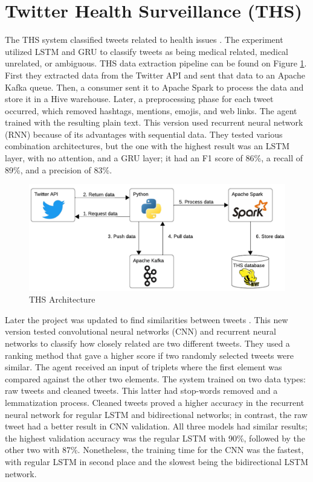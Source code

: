 \section{Twitter Health Surveillance (THS)}
The THS system classified tweets related to health issues \cite{8622504}. The experiment utilized LSTM and GRU to classify tweets as being medical related, medical unrelated, or ambiguous. THS
data extraction pipeline can be found on Figure \ref{ths_architecture}. First they extracted data from the Twitter API and sent that data to an Apache Kafka queue. Then, a consumer sent it to Apache Spark
to process the data and store it in a Hive warehouse. Later, a preprocessing phase for each tweet occurred, which removed hashtags, mentions, emojis, and web links. The agent trained with the resulting
plain text. This version used recurrent neural network (RNN) because of its advantages with sequential data. They tested various combination architectures, but the one with the highest result was an
LSTM layer, with no attention, and a GRU layer; it had an F1 score of 86\%, a recall of 89\%, and a precision of 83\%.  
 
  \begin{figure}[!h]
    \centering
        \includegraphics[width=1\linewidth]{images/ths_architecture.png}
        \caption{THS Architecture}
        \label{ths_architecture}
\end{figure}

 
Later the project was updated to find similarities between tweets \cite{9581175}. This new version tested convolutional neural networks (CNN) and recurrent neural networks to classify how closely related are two different tweets.
They used a ranking method that gave a higher score if two randomly selected tweets were similar. The agent received an input of triplets where the first element was compared against the other two elements.
The system trained on two data types: raw tweets and cleaned tweets. This latter had stop-words removed and a lemmatization process. Cleaned tweets proved a higher accuracy in the recurrent neural network
for regular LSTM and bidirectional networks; in contrast, the raw tweet had a better result in CNN validation. All three models had similar results; the highest validation accuracy was the regular LSTM with 90\%,
followed by the other two with 87\%. Nonetheless, the training time for the CNN was the fastest, with regular LSTM in second place and the slowest being the bidirectional LSTM network. 


